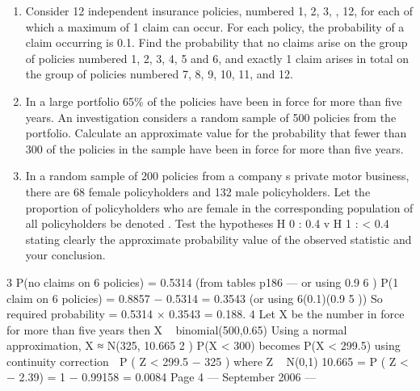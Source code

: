 \documentclass[a4paper,12pt]{article}
\begin{document}
\begin{enumerate}
\item 
Consider 12 independent insurance policies, numbered 1, 2, 3, , 12, for each of which a maximum of 1 claim can occur. For each policy, the probability of a claim
occurring is 0.1.
Find the probability that no claims arise on the group of policies numbered 1, 2, 3, 4, 5 and 6, and exactly 1 claim arises in total on the group of policies numbered 7, 8, 9,
10, 11, and 12.
\item In a large portfolio 65\% of the policies have been in force for more than five years. An investigation considers a random sample of 500 policies from the portfolio.
Calculate an approximate value for the probability that fewer than 300 of the policies in the sample have been in force for more than five years.
\item 
In a random sample of 200 policies from a company s private motor business, there are 68 female policyholders and 132 male policyholders.
Let the proportion of policyholders who are female in the corresponding population of all policyholders be denoted .
Test the hypotheses
H 0 :
0.4 v H 1 :
< 0.4
stating clearly the approximate probability value of the observed statistic and your conclusion.
\end{enumerate}
\newpage
3
P(no claims on 6 policies) = 0.5314 (from tables p186 — or using 0.9 6 )
P(1 claim on 6 policies) = 0.8857 − 0.5314 = 0.3543 (or using 6(0.1)(0.9 5 ))
So required probability = 0.5314 × 0.3543 = 0.188.
4
Let X be the number in force for more than five years
then X ~ binomial(500,0.65)
Using a normal approximation, X ≈ N(325, 10.665 2 )
P(X < 300) becomes P(X < 299.5) using continuity correction
 P ( Z <
299.5 − 325
) where Z ~ N(0,1)
10.665
= P ( Z < − 2.39) = 1 − 0.99158 = 0.0084
Page 4  — September 2006 — 
\end{document}
